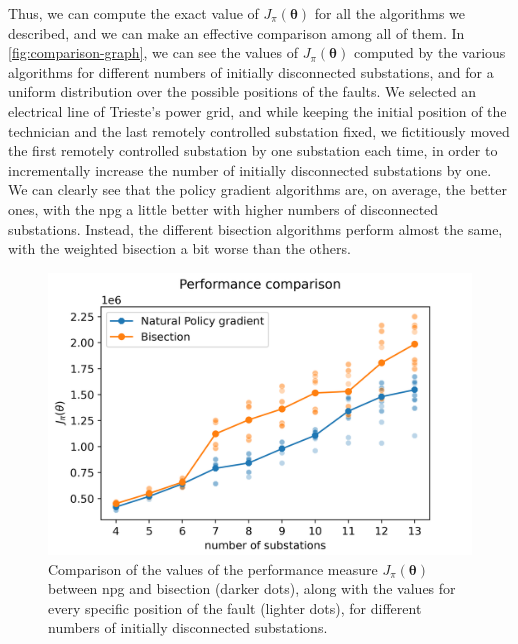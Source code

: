 Thus, we can compute the exact value of $J_\pi (\boldsymbol \theta)$ for all the algorithms we described, and we can make an effective comparison among all of them. In \autoref{fig:comparison-graph}, we can see the values of $J_\pi(\boldsymbol \theta)$ computed by the various algorithms for different numbers of initially disconnected substations, and for a uniform distribution over the possible positions of the faults. We selected an electrical line of Trieste's power grid, and while keeping the initial position of the technician and the last remotely controlled substation fixed, we fictitiously moved the first remotely controlled substation by one substation each time, in order to incrementally increase the number of initially disconnected substations by one.
We can clearly see that the policy gradient algorithms are, on average, the better ones, with the \acrshort{npg} a little better with higher numbers of disconnected substations. Instead, the different bisection algorithms perform almost the same, with the weighted bisection a bit worse than the others.

\begin{figure}[htb]
    \centering
    \includegraphics[scale=0.9]{chapters/figures/comparison_graph_scatterplot.png}
    \caption{Comparison of the values of the performance measure $J_\pi (\boldsymbol \theta)$ between \acrshort{npg} and bisection (darker dots), along with the values for every specific position of the fault (lighter dots), for different numbers of initially disconnected substations.}
    \label{fig:comparison-scatterplot}
\end{figure}

